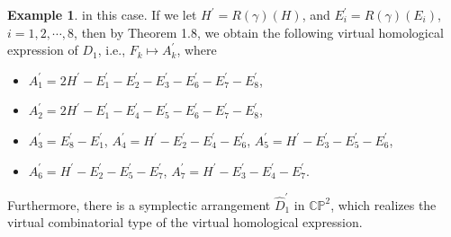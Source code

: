 \documentclass[11pt]{amsart}
\theoremstyle{plain}
\numberwithin{theorem}{section}
\theoremstyle{definition}
\newtheorem{example}[theorem]{Example}
\newcommand{\C}{{\mathbb C}}
\renewcommand{\P}{{\mathbb P}}
\begin{document}
\begin{example}
in this case. If we let $H^\prime=R(\gamma)(H)$, and $E_i^\prime=R(\gamma)(E_i)$, $i=1,2,\cdots,8$, then by Theorem 1.8, we obtain the following virtual homological expression of $D_1$, i.e., $F_k\mapsto A_k^\prime$, where
\begin{itemize}
\item $A_1^\prime=2H^\prime-E_{1}^\prime-E_{2}^\prime-E_{3}^\prime-E_6^\prime-E_7^\prime-E_8^\prime$, 
\item $A_2^\prime=2H^\prime-E_1^\prime-E_{4}^\prime-E_{5}^\prime-E_6^\prime-E_7^\prime-E_8^\prime$, 
\item $A_3^\prime=E_8^\prime-E_{1}^\prime$, $A_4^\prime=H^\prime-E_{2}^\prime-E_{4}^\prime-E_{6}^\prime$, 
$A_5^\prime=H^\prime-E_{3}^\prime-E_{5}^\prime-E_{6}^\prime$, 
\item $A_6^\prime=H^\prime-E_{2}^\prime-E_{5}^\prime-E_{7}^\prime$, 
$A_7^\prime=H^\prime-E_{3}^\prime-E_{4}^\prime-E_{7}^\prime$.
\end{itemize}
Furthermore,  there is a symplectic arrangement $\hat{D}_1^\prime$ in $\C\P^2$, which realizes the virtual combinatorial type of the virtual homological expression. 


\end{example}
\end{document}
